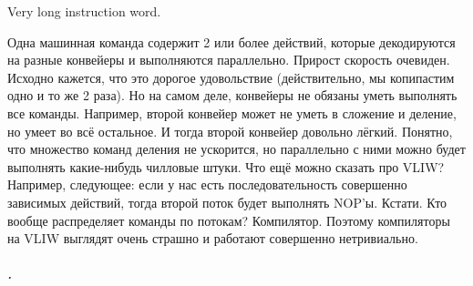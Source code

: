 \documentclass{article}
\begin{document}
    Very long instruction word.
    \begin{center}
    \end{center}
    Одна машинная команда содержит 2 или более действий, которые декодируются на разные конвейеры и выполняются параллельно. Прирост скорость очевиден. Исходно кажется, что это дорогое удовольствие (действительно, мы копипастим одно и то же 2 раза). Но на самом деле, конвейеры не обязаны уметь выполнять все команды. Например, второй конвейер может не уметь в сложение и деление, но умеет во всё остальное. И тогда второй конвейер довольно лёгкий. Понятно, что множество команд деления не ускорится, но параллельно с ними можно будет выполнять какие-нибудь чилловые штуки. Что ещё можно сказать про VLIW? Например, следующее: если у нас есть последовательность совершенно зависимых действий, тогда второй поток будет выполнять NOP'ы. Кстати. Кто вообще распределяет команды по потокам? Компилятор. Поэтому компиляторы на VLIW выглядят очень страшно и работают совершенно нетривиально.
    \subparagraph{.}
    \begin{center}
    \end{center}
\end{document}
